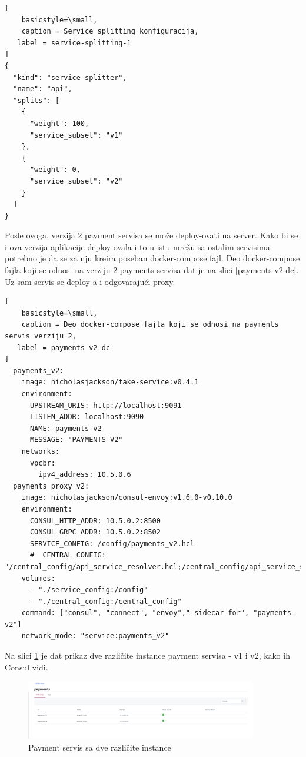 \documentclass[a4paper,12pt]{report}
\begin{document}
\begin{lstlisting}[
    basicstyle=\small,
    caption = Service splitting konfiguracija, 
   label = service-splitting-1
]
{
  "kind": "service-splitter",
  "name": "api",
  "splits": [
    {
      "weight": 100,
      "service_subset": "v1"
    },
    {
      "weight": 0,
      "service_subset": "v2"
    }
  ]
}
\end{lstlisting}

Posle ovoga, verzija 2 payment servisa se može deploy-ovati na server. Kako bi se i ova verzija aplikacije deploy-ovala i to u istu mrežu sa ostalim servisima potrebno je da se za nju kreira poseban docker-compose fajl. Deo docker-compose fajla koji se odnosi na verziju 2 payments servisa dat je na slici \ref{payments-v2-dc}. Uz sam servis se deploy-a i odgovarajući proxy. \newline

\begin{lstlisting}[
    basicstyle=\small,
    caption = Deo docker-compose fajla koji se odnosi na payments servis verziju 2, 
   label = payments-v2-dc
]
  payments_v2:
    image: nicholasjackson/fake-service:v0.4.1
    environment:
      UPSTREAM_URIS: http://localhost:9091
      LISTEN_ADDR: localhost:9090
      NAME: payments-v2
      MESSAGE: "PAYMENTS V2"
    networks:
      vpcbr:
        ipv4_address: 10.5.0.6
  payments_proxy_v2:
    image: nicholasjackson/consul-envoy:v1.6.0-v0.10.0
    environment:
      CONSUL_HTTP_ADDR: 10.5.0.2:8500
      CONSUL_GRPC_ADDR: 10.5.0.2:8502
      SERVICE_CONFIG: /config/payments_v2.hcl
      #  CENTRAL_CONFIG: "/central_config/api_service_resolver.hcl;/central_config/api_service_splitter_100_0.hcl"
    volumes:
      - "./service_config:/config"
      - "./central_config:/central_config"
    command: ["consul", "connect", "envoy","-sidecar-for", "payments-v2"]
    network_mode: "service:payments_v2"

\end{lstlisting}

Na slici \ref{fig:payment-sd} je dat prikaz dve različite instance payment servisa - v1 i v2, kako ih Consul vidi. \newline
 
\begin{figure}[h]
    \centering
    \includegraphics[width=0.9\textwidth]{payment_service_discovery_v1_v2}
    \caption{Payment servis sa dve različite instance}
    \label{fig:payment-sd}
\end{figure} 
\end{document}

